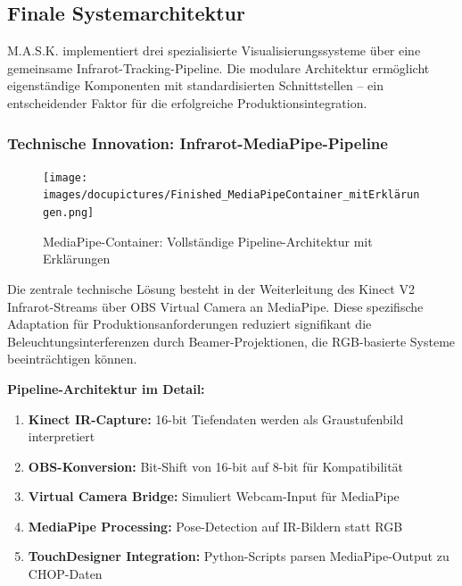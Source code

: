 
\subsection{Finale Systemarchitektur}

M.A.S.K. implementiert drei spezialisierte Visualisierungssysteme über eine gemeinsame Infrarot-Tracking-Pipeline. Die modulare Architektur ermöglicht eigenständige Komponenten mit standardisierten Schnittstellen – ein entscheidender Faktor für die erfolgreiche Produktionsintegration.

\newpage

\subsubsection{Technische Innovation: Infrarot-MediaPipe-Pipeline}

\begin{figure}[h]
    \centering
    \texttt{[image: images/docupictures/Finished\_MediaPipeContainer\_mitErklärungen.png]}
    \caption{MediaPipe-Container: Vollständige Pipeline-Architektur mit Erklärungen}
    \label{fig:mediapipe_architecture}
\end{figure}

Die zentrale technische Lösung besteht in der Weiterleitung des Kinect V2 Infrarot-Streams über OBS Virtual Camera an MediaPipe. Diese spezifische Adaptation für Produktionsanforderungen reduziert signifikant die Beleuchtungsinterferenzen durch Beamer-Projektionen, die RGB-basierte Systeme beeinträchtigen können.

\textbf{Pipeline-Architektur im Detail:}
\begin{enumerate}
    \item \textbf{Kinect IR-Capture:} 16-bit Tiefendaten werden als Graustufenbild interpretiert
    \item \textbf{OBS-Konversion:} Bit-Shift von 16-bit auf 8-bit für Kompatibilität
    \item \textbf{Virtual Camera Bridge:} Simuliert Webcam-Input für MediaPipe
    \item \textbf{MediaPipe Processing:} Pose-Detection auf IR-Bildern statt RGB
    \item \textbf{TouchDesigner Integration:} Python-Scripts parsen MediaPipe-Output zu CHOP-Daten
\end{enumerate}

